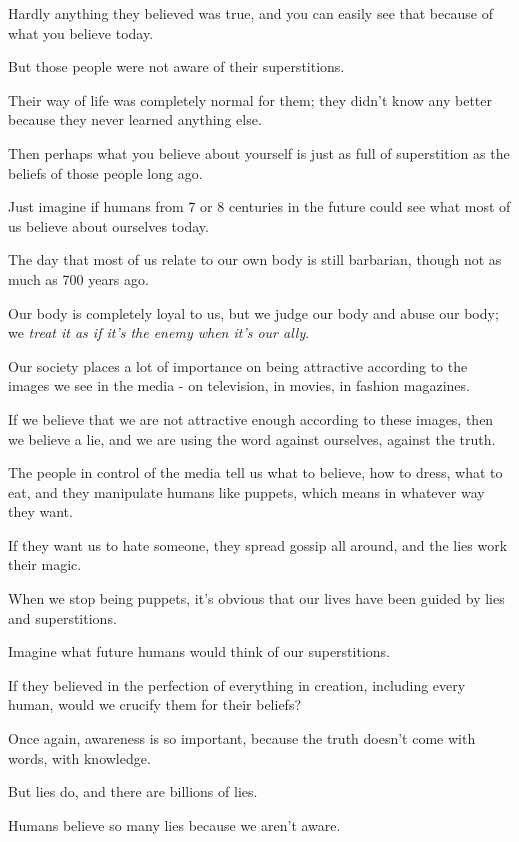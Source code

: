 \documentclass{article}
\numberwithin{equation}{section}
\begin{document}
Hardly anything they believed was true, and you can easily see that because of what you believe today.

But those people were not aware of their superstitions.

Their way of life was completely normal for them; they didn't know any better because they never learned anything else.

%
Then perhaps what you believe about yourself is just as full of superstition as the beliefs of those people long ago.

Just imagine if humans from 7 or 8 centuries in the future could see what most of us believe about ourselves today.

The day that most of us relate to our own body is still barbarian, though not as much as 700 years ago.

Our body is completely loyal to us, but we judge our body and abuse our body; we \textit{treat it as if it's the enemy when it's our ally}.

Our society places a lot of importance on being attractive according to the images we see in the media - on television, in movies, in fashion magazines.

If we believe that we are not attractive enough according to these images, then we believe a lie, and we are using the word against ourselves, against the truth.

%
The people in control of the media tell us what to believe, how to dress, what to eat, and they manipulate humans like puppets, which means in whatever way they want.

If they want us to hate someone, they spread gossip all around, and the lies work their magic.

When we stop being puppets, it's obvious that our lives have been guided by lies and superstitions.

Imagine what future humans would think of our superstitions.

If they believed in the perfection of everything in creation, including every human, would we crucify them for their beliefs?

%

Once again, awareness is so important, because the truth doesn't come with words, with knowledge.

But lies do, and there are billions of lies.

Humans believe so many lies because we aren't aware.
\end{document}
